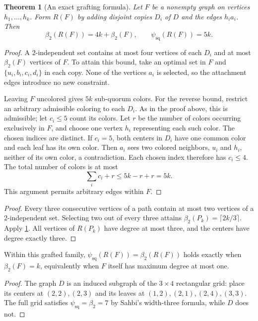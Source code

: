 \documentclass[11pt]{article}
\newtheorem{theorem}{Theorem}[section]
\newtheorem{corollary}[theorem]{Corollary}
\theoremstyle{definition}
\theoremstyle{remark}
\newcommand{\psq}{\psi_{\mathrm{sq}}}
\newcommand{\bii}{\beta_2}
\begin{document}
\begin{theorem}[An exact grafting formula]\label{thm:grafting}
Let $F$ be a nonempty graph on vertices $h_1,\ldots,h_k$. Form $R(F)$
by adding disjoint copies $D_i$ of $D$ and the edges $h_ia_i$. Then
\[
 \bii(R(F))=4k+\bii(F),\qquad \psq(R(F))=5k.
\]
\end{theorem}
\begin{proof}
A $2$-independent set contains at most four vertices of each $D_i$ and
at most $\bii(F)$ vertices of $F$. To attain this bound, take an optimal
set in $F$ and $\{u_i,b_i,c_i,d_i\}$ in each copy. None of the vertices
$a_i$ is selected, so the attachment edges introduce no new constraint.

Leaving $F$ uncolored gives $5k$ sub-quorum colors. For the reverse bound,
restrict an arbitrary admissible coloring to each $D_i$. As in the proof
above, this is admissible; let $c_i\le5$ count its colors. Let $r$ be the
number of colors occurring exclusively in $F$, and choose one vertex
$h_i$ representing each such color. The chosen indices are distinct.
If $c_i=5$, both centers in $D_i$ have one common color and each leaf has
its own color. Then $a_i$ sees two colored neighbors, $u_i$ and $h_i$,
neither of its own color, a contradiction. Each chosen index therefore
has $c_i\le4$. The total number of colors is at most
\[
 \sum_i c_i+r\le5k-r+r=5k.
\]
This argument permits arbitrary edges within $F$.
\end{proof}

\begin{proof}
Every three consecutive vertices of a path contain at most two vertices
of a $2$-independent set. Selecting two out of every three attains
$\bii(P_k)=\lceil2k/3\rceil$. Apply \cref{thm:grafting}.
All vertices of $R(P_k)$ have degree at most three, and the centers have
degree exactly three.
\end{proof}

Within this grafted family, $\psq(R(F))=\bii(R(F))$ holds exactly when
$\bii(F)=k$, equivalently when $F$ itself has maximum degree at most one.

\begin{proof}
The graph $D$ is an induced subgraph of the $3\times4$ rectangular grid:
place its centers at $(2,2),(2,3)$ and its leaves at
$(1,2),(2,1),(2,4),(3,3)$. The full grid satisfies
$\psq=\bii=7$ by Sahbi's width-three formula, while $D$ does not.
\end{proof}
\end{document}
